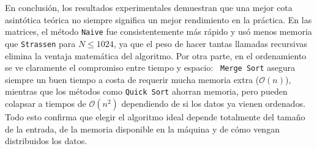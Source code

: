 En conclusión, los resultados experimentales demuestran que una mejor cota asintótica teórica no siempre significa un mejor rendimiento en la práctica. En las matrices, el método \texttt{Naive} fue consistentemente más rápido y usó menos memoria que \texttt{Strassen} para $N \le 1024$, ya que el peso de hacer tantas llamadas recursivas elimina la ventaja matemática del algoritmo. Por otra parte, en el ordenamiento se ve claramente el compromiso entre tiempo y espacio: \texttt{ Merge Sort} asegura siempre un buen tiempo a costa de requerir mucha memoria extra ($\mathcal{O}(n)$), mientras que los métodos como \texttt{Quick Sort} ahorran memoria, pero pueden colapsar a tiempos de $\mathcal{O}(n^2)$ dependiendo de si los datos ya vienen ordenados. Todo esto confirma que elegir el algoritmo ideal depende totalmente del tamaño de la entrada, de la memoria disponible en la máquina y de cómo vengan distribuidos los datos.